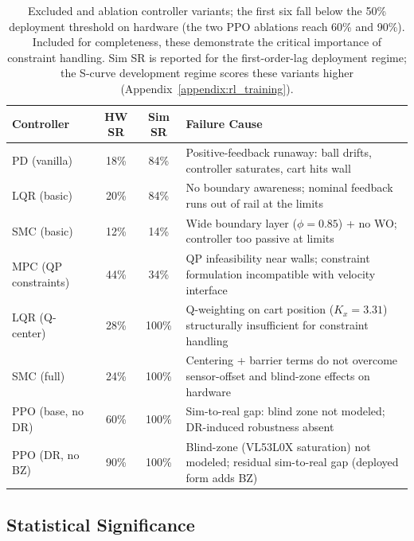 \begin{table}[t]
\centering
\caption{Excluded and ablation controller variants; the first six fall
         below the 50\% deployment threshold on hardware (the two PPO
         ablations reach 60\% and 90\%). Included for completeness,
         these demonstrate the critical importance of constraint handling.
         Sim SR is reported for the first-order-lag deployment regime; the
         S-curve development regime scores these variants higher
         (Appendix~\ref{appendix:rl_training}).}
\label{tab:failed_variants}
\begin{tabular}{lccp{7cm}}
\toprule
\textbf{Controller} & \textbf{HW SR} & \textbf{Sim SR} & \textbf{Failure Cause} \\
\midrule
PD (vanilla) & 18\% & 84\% & Positive-feedback runaway: ball drifts, controller saturates, cart hits wall \\
LQR (basic) & 20\% & 84\% & No boundary awareness; nominal feedback runs out of rail at the limits \\
SMC (basic) & 12\% & 14\% & Wide boundary layer ($\phi=0.85$) + no WO; controller too passive at limits \\
MPC (QP constraints) & 44\% & 34\% & QP infeasibility near walls; constraint formulation incompatible with velocity interface \\
LQR (Q-center) & 28\% & 100\% & Q-weighting on cart position ($K_x=3.31$) structurally insufficient for constraint handling \\
SMC (full) & 24\% & 100\% & Centering + barrier terms do not overcome sensor-offset and blind-zone effects on hardware \\
PPO (base, no DR) & 60\% & 100\% & Sim-to-real gap: blind zone not modeled; DR-induced robustness absent \\
PPO (DR, no BZ) & 90\% & 100\% & Blind-zone (VL53L0X saturation) not modeled; residual sim-to-real gap (deployed form adds BZ) \\
\bottomrule
\end{tabular}
\end{table}

\subsection{Statistical Significance}

